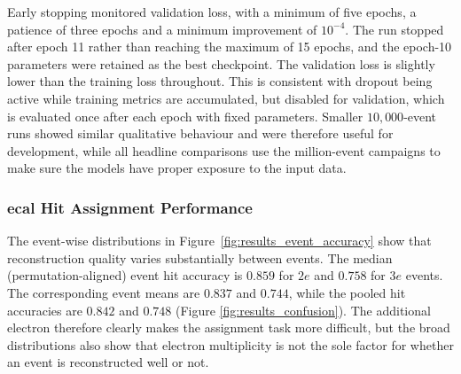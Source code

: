 Early stopping monitored validation loss, with a minimum of five epochs, a
patience of three epochs and a minimum improvement of \(10^{-4}\). The run
stopped after epoch 11 rather than reaching the maximum of 15 epochs, and the
epoch-10 parameters were retained as the best checkpoint. The validation loss
is slightly lower than the training loss throughout. This is consistent with
dropout being active while training metrics are accumulated, but disabled for
validation, which is evaluated once after each epoch with fixed parameters.
Smaller \(10{,}000\)-event runs showed similar qualitative behaviour and were
therefore useful for development, while all headline comparisons use the
million-event campaigns to make sure the models have proper exposure to the input data.




\subsubsection{\gls{ecal} Hit Assignment Performance}
\label{sec:results_detailed_hit_assignment}


The event-wise distributions in Figure~\ref{fig:results_event_accuracy}
show that reconstruction quality varies substantially between events. The
median (permutation-aligned) event hit accuracy is \(0.859\) for \(2e\) and
\(0.758\) for \(3e\) events. The corresponding event means are \(0.837\) and
\(0.744\), while the pooled hit accuracies are \(0.842\) and \(0.748\) (Figure \ref{fig:results_confusion}).
The additional electron therefore clearly makes the assignment task more difficult,
but the broad distributions also show that electron multiplicity is not the sole factor for whether an event is reconstructed well or not.

